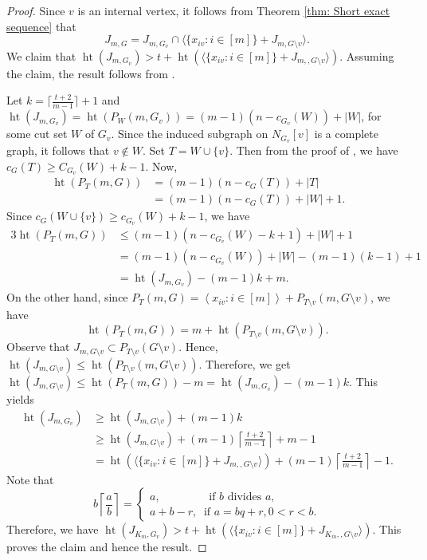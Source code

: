 \documentclass[12pt,reqno]{amsart}
\newcommand \h{\operatorname{ht}}
\DeclareMathOperator{\height}{ht}
\theoremstyle{plain}
\theoremstyle{definition}
\begin{document}
\begin{proof}
   Since $v$ is an internal vertex, it follows from Theorem \ref{thm: Short exact sequence} that $$J_{m,G}=J_{m,{G_v}}\cap \langle\{ x_{iv}:i\in [m]\}+J_{m,{G\setminus v}}\rangle.$$ We claim that $\h(J_{m,G_v})>t+\h(\langle\{ x_{iv}:i\in [m]\}+J_{m,,{G\setminus v}}\rangle).$ Assuming the claim, the result follows from \cite[Lemma 3.1]{KKP-Hilbert-coefficients-regularity-BEI}.
   
   Let $k=\lceil\frac{t+2}{m-1}\rceil+1$ and $\height(J_{m,G_v})=\height(P_{W}(m,G_v))=(m-1)(n-c_{G_v}(W))+|W|$, for some cut set $W$ of $G_v$. Since the induced subgraph on $N_{G_v}[v]$ is a complete graph, it follows that $v\notin W$.  Set $T=W\cup \{v\}$. Then from the proof of \cite[Theorem 3.3]{KKP-Hilbert-coefficients-regularity-BEI}, we have $c_G(T)\geq C_{G_v}(W)+k-1$. 
   Now, 
    \begin{align*}
            \height\left (P_T(m,G)\right ) & = (m-1)(n-c_G(T))+|T| \qquad && \text{}\\
            & = (m-1)(n-c_G(T))+|W|+1.
     \end{align*}
Since $c_{G}(W\cup \{v\})\geq c_{G_v}(W)+k-1$, we have 
     \begin{alignat*}{3}
          \height\left (P_T(m,G)\right )  &\leq (m-1)(n-c_{G_v}(W)-k+1)+|W|+1  \quad && \\
            & = (m-1)(n-c_{G_v}(W))+|W|-(m-1)(k-1)+1\qquad && \\
            & =\height(J_{m,G_v})-(m-1)k+m.
        \end{alignat*}
On the other hand, since $P_T(m,G)=\left\langle x_{iv}:i\in [m] \right \rangle+ P_{T\setminus v}(m,G\setminus v)$, we have $$\height\left (P_T(m,G)\right )= m+ \height\left (P_{T\setminus v}(m,G\setminus v)\right).$$ Observe that $J_{m,G\setminus v}\subset P_{T\setminus v}(G\setminus v)$. Hence,  $\height\left (J_{m,G\setminus{v}}\right ) \leq \height\left (P_{T\setminus v}(m,G\setminus v)\right)$.
Therefore, we get 
$\height(J_{m,G\setminus{v}})\leq \height(P_{T}(m,G))-m=\height(J_{m,G_v}) -(m-1)k.$ This yields
\begin{align*}
    \height(J_{m,G_v})&\geq \height(J_{m,G\setminus{v}})+(m-1)k\\
    &\geq \height(J_{m,G\setminus{v}})+(m-1)\left\lceil\frac{t+2}{m-1}\right\rceil+m-1\\
    &=\h(\langle\{ x_{iv}:i\in [m]\}+J_{m,,{G\setminus v}}\rangle)+(m-1)\left\lceil\frac{t+2}{m-1}\right\rceil-1.
\end{align*}
Note that  $$b\left\lceil\frac{a}{b}\right\rceil=\begin{cases}
    a, \qquad\quad\quad\text{ if $b$ divides $a$},\\
    a+b-r, ~\text{ if $a=bq+r,0<r<b$}.
\end{cases}$$
Therefore, we have $\h(J_{K_m,G_v})>t+\h(\langle\{ x_{iv}:i\in [m]\}+J_{K_m,,{G\setminus v}}\rangle)$. This proves the claim and hence the result.
\end{proof}
\end{document}
